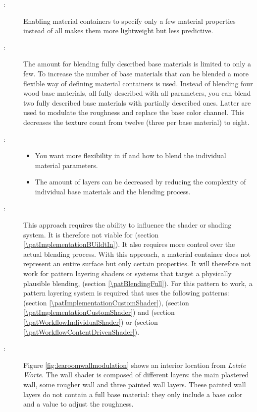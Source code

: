 \begin{description}
	\item[\patIntent:]%
	Enabling material containers to specify only a few material properties instead of all makes them more lightweight but less predictive.
	\item[\patMotivation:]%
	The amount for blending fully described base materials is limited to only a few. To increase the number of base materials that can be blended a more flexible way of defining material containers is used. Instead of blending four wood base materials, all fully described with all parameters, you can blend two fully described base materials with partially described ones. Latter are used to modulate the roughness and replace the base color channel. This decreases the texture count from twelve (three per base material) to eight. 
	\item[\patApplicability:]\hfill
	\begin{itemize}\mynobreakpar
		\item You want more flexibility in if and how to blend the individual material parameters.
		\item The amount of layers can be decreased by reducing the complexity of individual base materials and the blending process. 
	\end{itemize}
	\item[\patImplementation:]%
	This approach requires the ability to influence the shader or shading system. It is therefore not viable for \emph{\patImplementationBUildtIn} (section \ref{\patImplementationBUildtIn}). It also requires more control over the actual blending process. With this approach, a material container does not represent an entire surface but only certain properties. It will therefore not work for pattern layering shaders or systems that target a physically plausible blending, \emph{\patBlendingFull} (section \ref{\patBlendingFull}). For this pattern to work, a pattern layering system is required that uses the following patterns: \emph{\patImplementationCustomShader} (section \ref{\patImplementationCustomShader}), \emph{\patBlendingPartially} (section \ref{\patImplementationCustomShader}) and \emph{\patWorkflowIndividualShader} (section \ref{\patWorkflowIndividualShader}) or \emph{\patWorkflowContentDrivenShader} (section \ref{\patWorkflowContentDrivenShader}).
	\item[\patExamples:]%
	Figure \ref{fig:learoomwallmodulation} shows an interior location from \emph{Letzte Worte}. The wall shader is composed of different layers: the main plastered wall, some rougher wall and three painted wall layers. These painted wall layers do not contain a full base material: they only include a base color and a value to adjust the roughness.  

\end{description}
